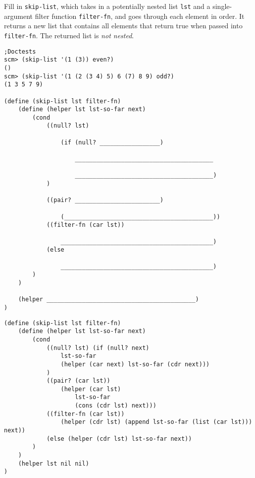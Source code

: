 \question Fill in \lstinline{skip-list}, which takes in a potentially nested list \lstinline{lst} and a single-argument filter function \lstinline{filter-fn}, and goes through each element in order. It returns a new list that contains all elements that return true when passed into \lstinline{filter-fn}. The returned list is \textit{not nested}.

\begin{lstlisting}
;Doctests
scm> (skip-list '(1 (3)) even?)
()
scm> (skip-list '(1 (2 (3 4) 5) 6 (7) 8 9) odd?)
(1 3 5 7 9)

(define (skip-list lst filter-fn)
    (define (helper lst lst-so-far next)
        (cond
            ((null? lst)

                (if (null? _________________)

                    _______________________________________

                    _______________________________________)
            )

            ((pair? ________________________)

                (__________________________________________))
            ((filter-fn (car lst))

                ___________________________________________)
            (else

                ___________________________________________)
        )
    )

    (helper __________________________________________)
)
\end{lstlisting}

\begin{solution}
\begin{lstlisting}
(define (skip-list lst filter-fn)
    (define (helper lst lst-so-far next)
        (cond
            ((null? lst) (if (null? next)
                lst-so-far
                (helper (car next) lst-so-far (cdr next)))
            )
            ((pair? (car lst))
                (helper (car lst)
                    lst-so-far
                    (cons (cdr lst) next)))
            ((filter-fn (car lst))
                (helper (cdr lst) (append lst-so-far (list (car lst))) next))
            (else (helper (cdr lst) lst-so-far next))
        )
    )
    (helper lst nil nil)
)

\end{lstlisting}
\end{solution}

